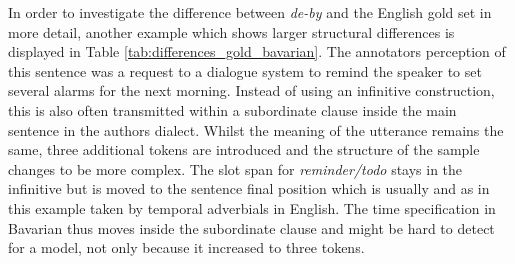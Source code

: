 \documentclass[11pt,a4paper,twoside,openright]{scrbook}
\begin{document}
In order to investigate the difference between \textit{de-by} and the English gold set in more detail, another example which shows larger structural differences is displayed in Table \ref{tab:differences_gold_bavarian}. The annotators perception of this sentence was a request to a dialogue system to remind the speaker to set several alarms for the next morning. Instead of using an infinitive construction, this is also often transmitted within a subordinate clause inside the main sentence in the authors dialect. Whilst the meaning of the utterance remains the same, three additional tokens are introduced and the structure of the sample changes to be more complex. The slot span for \textit{reminder/todo} stays in the infinitive but is moved to the sentence final position which is usually and as in this example taken by temporal adverbials in English. The time specification in Bavarian thus moves inside the subordinate clause and might be hard to detect for a model, not only because it increased to three tokens. 
\end{document}
